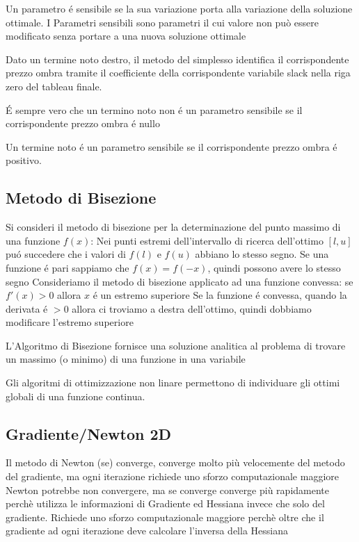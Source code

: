 \documentclass[12pt, a4paper, openany]{book}
\begin{document}
\affermazionetrue
{Un parametro é sensibile se la sua variazione porta alla variazione della soluzione ottimale.}
{I Parametri sensibili sono parametri il cui valore non può essere modificato senza portare a una nuova soluzione ottimale}

\affermazionetrue
{Dato un termine noto destro, il metodo del simplesso identifica il corrispondente prezzo ombra tramite il coefficiente
della corrispondente variabile slack nella riga zero del tableau finale.}
{}

\affermazione
{É sempre vero che un termino noto non é un parametro sensibile se il corrispondente prezzo ombra é nullo}

\affermazione
{Un termine noto é un parametro sensibile se il corrispondente prezzo ombra é positivo.}

\subsection{Metodo di Bisezione}
\affermazionetrue
{
    Si consideri il metodo di bisezione per la determinazione del punto massimo di una funzione $f(x)$: Nei punti estremi dell'intervallo
    di ricerca dell'ottimo $[l,u]$ puó succedere che i valori di $f(l)$ e $f(u)$ abbiano lo stesso segno.
}
{
    Se una funzione é pari sappiamo che $f(x)=f(-x)$, quindi possono avere lo stesso segno
}
\affermazionetrue
{Consideriamo il metodo di bisezione applicato ad una funzione convessa: se $f'(x)>0$ allora $x$ é un estremo superiore}
{Se la funzione é convessa, quando la derivata é $>0$ allora ci troviamo a destra dell'ottimo, quindi dobbiamo modificare l'estremo superiore}

\affermazione
{L'Algoritmo di Bisezione fornisce una soluzione analitica al problema di trovare un massimo (o minimo) di una funzione in una variabile}

\affermazione
{Gli algoritmi di ottimizzazione non linare permettono di individuare gli ottimi globali di una funzione continua.}

\subsection{Gradiente/Newton 2D}

\affermazionetrue
{Il metodo di Newton (se) converge, converge molto più velocemente del metodo del gradiente, ma ogni iterazione richiede uno sforzo computazionale maggiore}
{Newton potrebbe non convergere, ma se converge converge più rapidamente perchè utilizza le informazioni di Gradiente ed Hessiana invece che solo del gradiente.
Richiede uno sforzo computazionale maggiore perchè oltre che il gradiente ad ogni iterazione deve calcolare l'inversa della Hessiana}
\end{document}
